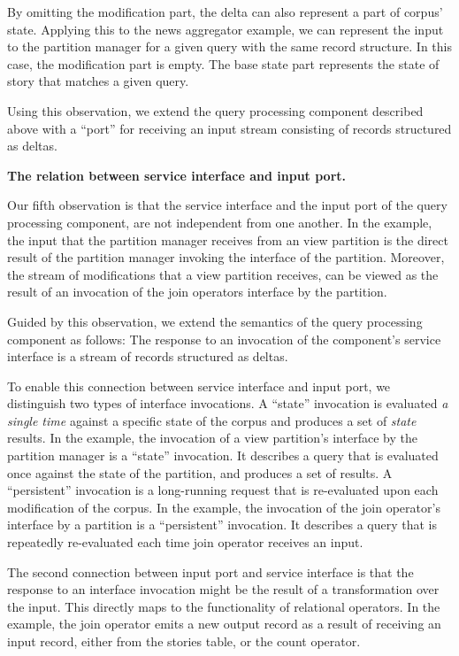 By omitting the modification part, the delta can also represent a part of corpus' state.
Applying this to the news aggregator example,
we can represent the input to the partition manager for a given query with the same record structure.
In this case, the modification part is empty.
The base state part represents the state of story that matches a given query.

Using this observation,
we extend the query processing component described above with a ``port'' for receiving an input stream consisting of records structured as deltas.

\vspace{12pt}
\noindent
\textbf{The relation between service interface and input port.}

\noindent
Our fifth observation is that the service interface and the input port of the query processing component,
are not independent from one another.
In the example, the input that the partition manager receives from an view partition
is the direct result of the partition manager invoking the interface of the partition.
Moreover, the stream of modifications that a view partition receives,
can be viewed as the result of an invocation of the join operators interface by the partition.

Guided by this observation, we extend the semantics of the query processing component as follows:
The response to an invocation of the component's service interface is a stream of records structured as deltas.

To enable this connection between service interface and input port, we distinguish two types of interface invocations.
A ``state'' invocation is evaluated \textit{a single time} against a specific state of the corpus and produces a set of
\textit{state} results.
In the example, the invocation of a view partition's interface by the partition manager is a ``state'' invocation.
It describes a query that is evaluated once against the state of the partition, and produces a set of results.
A ``persistent'' invocation is a long-running request that is re-evaluated upon each modification of the corpus.
In the example, the invocation of the join operator's interface by a partition is a ``persistent'' invocation.
It describes a query that is repeatedly re-evaluated each time join operator receives an input.

The second connection between input port and service interface is that the response to an interface invocation might be
the result of a transformation over the input.
This directly maps to the functionality of relational operators.
In the example, the join operator emits a new output record as a result of receiving an input record, either from the
stories table, or the count operator.

